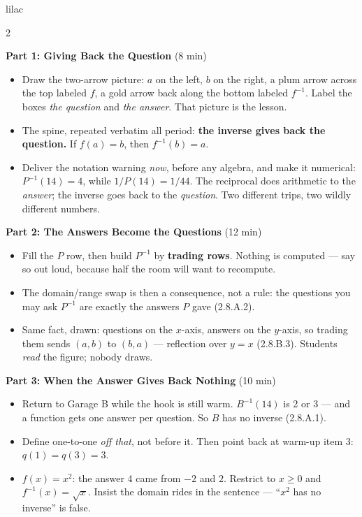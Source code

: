 \documentclass[10pt]{article}
\begin{document}
\begin{skillbox}[Lesson]{lilac}
\begin{multicols}{2}

\textbf{Part 1: Giving Back the Question} (8 min)

\begin{itemize}
  \item Draw the two-arrow picture: $a$ on the left, $b$ on the right, a plum
        arrow across the top labeled $f$, a gold arrow back along the bottom
        labeled $f^{-1}$. Label the boxes \textit{the question} and
        \textit{the answer}. That picture is the lesson.
  \item The spine, repeated verbatim all period: \textbf{the inverse gives back
        the question.} If $f(a) = b$, then $f^{-1}(b) = a$.
  \item Deliver the notation warning \textit{now}, before any algebra, and make
        it numerical: $P^{-1}(14) = 4$, while $1/P(14) = 1/44$. The reciprocal
        does arithmetic to the \textit{answer}; the inverse goes back to the
        \textit{question}. Two different trips, two wildly different numbers.
\end{itemize}

\textbf{Part 2: The Answers Become the Questions} (12 min)

\begin{itemize}
  \item Fill the $P$ row, then build $P^{-1}$ by \textbf{trading rows}. Nothing
        is computed --- say so out loud, because half the room will want to
        recompute.
  \item The domain/range swap is then a consequence, not a rule: the questions
        you may ask $P^{-1}$ are exactly the answers $P$ gave (2.8.A.2).
  \item Same fact, drawn: questions on the $x$-axis, answers on the $y$-axis,
        so trading them sends $(a,b)$ to $(b,a)$ --- reflection over $y = x$
        (2.8.B.3). Students \textit{read} the figure; nobody draws.
\end{itemize}

\textbf{Part 3: When the Answer Gives Back Nothing} (10 min)

\begin{itemize}
  \item Return to Garage B while the hook is still warm. $B^{-1}(14)$ is 2 or 3
        --- and a function gets one answer per question. So $B$ has no inverse
        (2.8.A.1).
  \item Define one-to-one \textit{off that}, not before it. Then point back at
        warm-up item 3: $q(1) = q(3) = 3$.
  \item $f(x) = x^2$: the answer 4 came from $-2$ and $2$. Restrict to
        $x \ge 0$ and $f^{-1}(x) = \sqrt{x}$. Insist the domain rides in the
        sentence --- ``$x^2$ has no inverse'' is false.
\end{itemize}


\end{multicols}
\end{skillbox}
\end{document}
